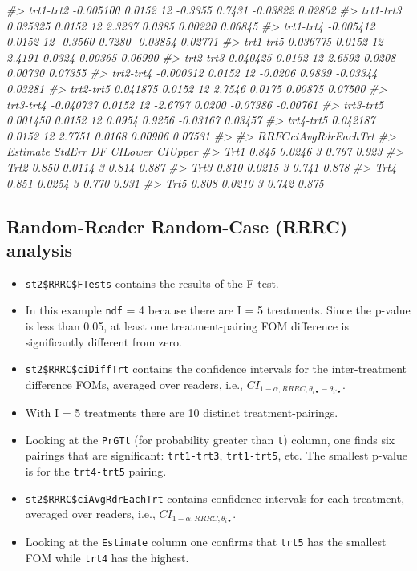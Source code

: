 \documentclass[
]{book}
\newenvironment{Shaded}{\begin{snugshade}}{\end{snugshade}}
\newcommand{\CommentTok}[1]{\textcolor[rgb]{0.56,0.35,0.01}{\textit{#1}}}
\begin{document}
\begin{Shaded}
\begin{Highlighting}[]
\CommentTok{#> trt1-trt2 -0.005100 0.0152 12 -0.3355 0.7431 -0.03822  0.02802}
\CommentTok{#> trt1-trt3  0.035325 0.0152 12  2.3237 0.0385  0.00220  0.06845}
\CommentTok{#> trt1-trt4 -0.005412 0.0152 12 -0.3560 0.7280 -0.03854  0.02771}
\CommentTok{#> trt1-trt5  0.036775 0.0152 12  2.4191 0.0324  0.00365  0.06990}
\CommentTok{#> trt2-trt3  0.040425 0.0152 12  2.6592 0.0208  0.00730  0.07355}
\CommentTok{#> trt2-trt4 -0.000312 0.0152 12 -0.0206 0.9839 -0.03344  0.03281}
\CommentTok{#> trt2-trt5  0.041875 0.0152 12  2.7546 0.0175  0.00875  0.07500}
\CommentTok{#> trt3-trt4 -0.040737 0.0152 12 -2.6797 0.0200 -0.07386 -0.00761}
\CommentTok{#> trt3-trt5  0.001450 0.0152 12  0.0954 0.9256 -0.03167  0.03457}
\CommentTok{#> trt4-trt5  0.042187 0.0152 12  2.7751 0.0168  0.00906  0.07531}
\CommentTok{#> }
\CommentTok{#> $RRFC$ciAvgRdrEachTrt}
\CommentTok{#>      Estimate StdErr DF CILower CIUpper}
\CommentTok{#> Trt1    0.845 0.0246  3   0.767   0.923}
\CommentTok{#> Trt2    0.850 0.0114  3   0.814   0.887}
\CommentTok{#> Trt3    0.810 0.0215  3   0.741   0.878}
\CommentTok{#> Trt4    0.851 0.0254  3   0.770   0.931}
\CommentTok{#> Trt5    0.808 0.0210  3   0.742   0.875}
\end{Highlighting}
\end{Shaded}

\hypertarget{or-applications-RRRC-dataset04}{%
\subsection{Random-Reader Random-Case (RRRC) analysis}\label{or-applications-RRRC-dataset04}}

\begin{itemize}
\item
  \texttt{st2\$RRRC\$FTests} contains the results of the F-test.
\item
  In this example \texttt{ndf} = 4 because there are I = 5 treatments. Since the p-value is less than 0.05, at least one treatment-pairing FOM difference is significantly different from zero.
\item
  \texttt{st2\$RRRC\$ciDiffTrt} contains the confidence intervals for the inter-treatment difference FOMs, averaged over readers, i.e., \(CI_{1-\alpha,RRRC,\theta_{i \bullet} - \theta_{i' \bullet}}\).
\item
  With I = 5 treatments there are 10 distinct treatment-pairings.
\item
  Looking at the \texttt{PrGTt} (for probability greater than \texttt{t}) column, one finds six pairings that are significant: \texttt{trt1-trt3}, \texttt{trt1-trt5}, etc. The smallest p-value is for the \texttt{trt4-trt5} pairing.
\item
  \texttt{st2\$RRRC\$ciAvgRdrEachTrt} contains confidence intervals for each treatment, averaged over readers, i.e., \(CI_{1-\alpha,RRRC,\theta_{i \bullet}}\).
\item
  Looking at the \texttt{Estimate} column one confirms that \texttt{trt5} has the smallest FOM while \texttt{trt4} has the highest.
\end{itemize}
\end{document}
